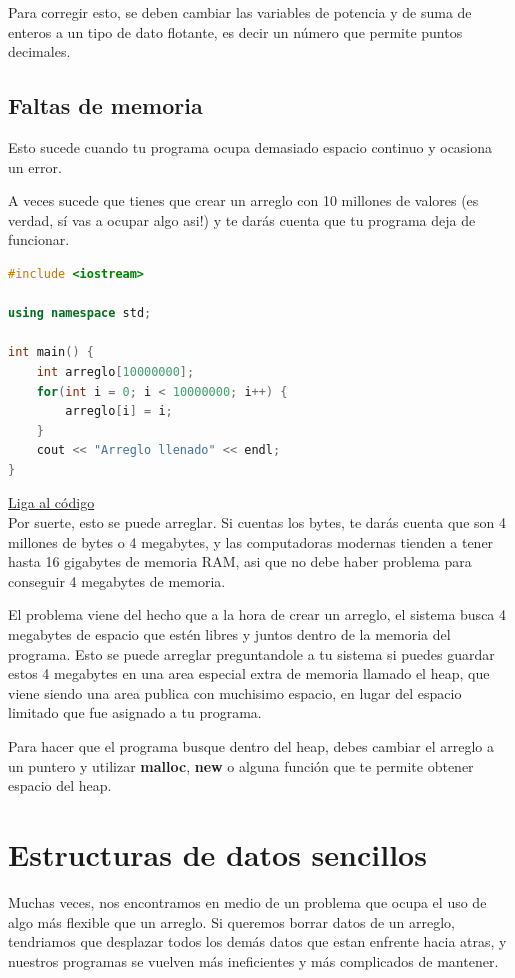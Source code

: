 \documentclass{article}
\begin{document}
Para corregir esto, se deben cambiar las variables de potencia y de suma de enteros a un tipo de dato flotante, es decir un número que permite puntos decimales.

\subsection{Faltas de memoria}
Esto sucede cuando tu programa ocupa demasiado espacio continuo y ocasiona un error.

A veces sucede que tienes que crear un arreglo con 10 millones de valores (es verdad, sí vas a ocupar algo asi!) y te darás cuenta que tu programa deja de funcionar.

\begin{lstlisting}[language=C++, title=Faltas de memoria]
#include <iostream>

using namespace std;

int main() {
	int arreglo[10000000];
	for(int i = 0; i < 10000000; i++) {
		arreglo[i] = i;
	}
	cout << "Arreglo llenado" << endl;
}
\end{lstlisting}
\href{https://repl.it/@Jamesscn/Arreglo-no-arreglado}{Liga al código}\\

Por suerte, esto se puede arreglar. Si cuentas los bytes, te darás cuenta que son 4 millones de bytes o 4 megabytes, y las computadoras modernas tienden a tener hasta 16 gigabytes de memoria RAM, asi que no debe haber problema para conseguir 4 megabytes de memoria.

El problema viene del hecho que a la hora de crear un arreglo, el sistema busca 4 megabytes de espacio que estén libres y juntos dentro de la memoria del programa. Esto se puede arreglar preguntandole a tu sistema si puedes guardar estos 4 megabytes en una area especial extra de memoria llamado el heap, que viene siendo una area publica con muchisimo espacio, en lugar del espacio limitado que fue asignado a tu programa.

Para hacer que el programa busque dentro del heap, debes cambiar el arreglo a un puntero y utilizar \textbf{malloc}, \textbf{new} o alguna función que te permite obtener espacio del heap.

\section{Estructuras de datos sencillos}

Muchas veces, nos encontramos en medio de un problema que ocupa el uso de algo más flexible que un arreglo. Si queremos borrar datos de un arreglo, tendriamos que desplazar todos los demás datos que estan enfrente hacia atras, y nuestros programas se vuelven más ineficientes y más complicados de mantener.
\end{document}
